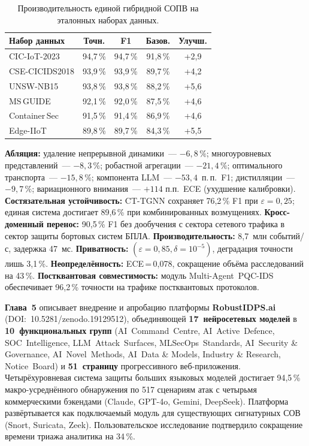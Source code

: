 \documentclass[12pt,a5paper]{article}
\begin{document}
\begin{table}[H]
\centering
\caption{Производительность единой гибридной СОПВ на
эталонных наборах данных.}
\small
\begin{tabular}{lcccc}
\toprule
\textbf{Набор данных} & \textbf{Точн.} & \textbf{F1} & \textbf{Базов.} & \textbf{Улучш.} \\
\midrule
CIC-IoT-2023 & 94,7\,\% & 94,7\,\% & 91,8\,\% & +2,9 \\
CSE-CICIDS2018 & 93,9\,\% & 93,9\,\% & 89,7\,\% & +4,2 \\
UNSW-NB15 & 93,8\,\% & 93,8\,\% & 88,2\,\% & +5,6 \\
MS\,GUIDE & 92,1\,\% & 92,0\,\% & 87,5\,\% & +4,6 \\
Container\,Sec & 91,5\,\% & 91,4\,\% & 86,9\,\% & +4,6 \\
Edge-IIoT & 89,8\,\% & 89,7\,\% & 84,3\,\% & +5,5 \\
\bottomrule
\end{tabular}
\end{table}

\textbf{Абляция:} удаление непрерывной динамики~--- $-6{,}8\,\%$;
многоуровневых представлений~--- $-8{,}3\,\%$; робастной
агрегации~--- $-21{,}4\,\%$; оптимального транспорта~---
$-15{,}8\,\%$; компонента LLM~--- $-53{,}4$~п.\,п.\ F1;
дистилляции~--- $-9{,}7\,\%$; вариационного внимания~---
$+114$ п.п.\ ECE (ухудшение калибровки).
\textbf{Состязательная устойчивость:} CT-TGNN сохраняет
76,2\,\% F1 при $\varepsilon{=}0{,}25$; единая система
достигает 89,6\,\% при комбинированных возмущениях.
\textbf{Кросс-доменный перенос:} 90,5\,\% F1 без дообучения
с сектора сетевого трафика в сектор защиты бортовых систем
БПЛА. \textbf{Производительность:} 8,7~млн событий/с,
задержка 47~мс. \textbf{Приватность:}
$(\varepsilon{=}0{,}85,\delta{=}10^{-5})$, деградация
точности лишь 3,1\,\%. \textbf{Неопределённость:}
ECE\,=\,0,078, сокращение объёма расследований на 43\,\%.
\textbf{Постквантовая совместимость:} модуль
Multi-Agent~PQC-IDS обеспечивает 96,2\,\% точности на
трафике постквантовых протоколов.

\textbf{Глава~5} описывает внедрение и апробацию платформы
\textbf{RobustIDPS.ai} (DOI:~10.5281/zenodo.19129512),
объединяющей \textbf{17~нейросетевых моделей} в
\textbf{10~функциональных групп} (AI~Command~Centre,
AI~Active~Defence, SOC~Intelligence, LLM~Attack~Surfaces,
MLSecOps~Standards, AI~Security \& Governance,
AI~Novel~Methods, AI~Data \& Models, Industry \& Research,
Notice~Board) и \textbf{51~страницу} прогрессивного
веб-приложения. Четырёхуровневая система защиты больших
языковых моделей достигает 94,5\,\% макро-усреднённого
обнаружения по 517 сценариям атак с четырьмя коммерческими
бэкендами (Claude, GPT-4o, Gemini, DeepSeek). Платформа
развёртывается как подключаемый модуль для существующих
сигнатурных СОВ (Snort, Suricata, Zeek).
Пользовательское исследование подтвердило сокращение времени
триажа аналитика на 34\,\%.
\end{document}
